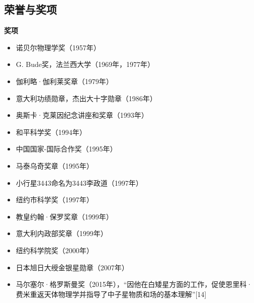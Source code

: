\subsection{荣誉与奖项}
\textbf{奖项}  
\begin{itemize}
\item 诺贝尔物理学奖（1957年）  
\item G. Bude奖，法兰西大学（1969年，1977年）  
\item 伽利略·伽利莱奖章（1979年）  
\item 意大利功绩勋章，杰出大十字勋章（1986年）  
\item 奥斯卡·克莱因纪念讲座和奖章（1993年）  
\item 和平科学奖（1994年）  
\item 中国国家-国际合作奖（1995年）  
\item 马泰乌奇奖章（1995年）  
\item 小行星3443命名为3443李政道（1997年）  
\item 纽约市科学奖（1997年）  
\item 教皇约翰·保罗奖章（1999年）  
\item 意大利内政部奖章（1999年）  
\item 纽约科学院奖（2000年）  
\item 日本旭日大绶金银星勋章（2007年）  
\item 马尔塞尔·格罗斯曼奖（2015年），“因他在白矮星方面的工作，促使恩里科·费米重返天体物理学并指导了中子星物质和场的基本理解”[14]
\end{itemize}